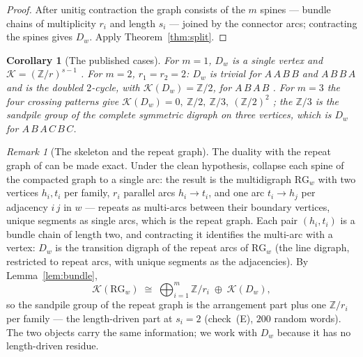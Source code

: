 \documentclass[11pt]{article}
\theoremstyle{plain}
\newtheorem{corollary}[theorem]{Corollary}
\theoremstyle{definition}
\theoremstyle{remark}
\newtheorem{remark}[theorem]{Remark}
\newcommand{\Z}{\mathbb{Z}}
\newcommand{\K}{\mathcal{K}}
\begin{document}
\begin{proof}
After unitig contraction the graph consists of the $m$ spines --- bundle chains of
multiplicity $r_i$ and length $s_i$ --- joined by the connector arcs; contracting the
spines gives $D_w$. Apply Theorem~\ref{thm:split}.
\end{proof}

\begin{corollary}[The published cases]\label{cor:cases}
For $m=1$, $D_w$ is a single vertex and $\K=(\Z/r)^{s-1}$ \cite[Thm.~5]{Bio1}. For $m=2$,
$r_1=r_2=2$: $D_w$ is trivial for $A\,A\,B\,B$ and $A\,B\,B\,A$ and is the doubled
$2$-cycle, with $\K(D_w)=\Z/2$, for $A\,B\,A\,B$ \cite[Thm.~6]{Bio1}. For $m=3$ the four
crossing patterns give $\K(D_w)=0,\ \Z/2,\ \Z/3,\ (\Z/2)^{2}$ \cite[Prop.~8]{Bio1}; the
$\Z/3$ is the sandpile group of the complete symmetric digraph on three vertices, which is
$D_w$ for $A\,B\,A\,C\,B\,C$.
\end{corollary}

\begin{remark}[The skeleton and the repeat graph]\label{rem:rg}
The duality with the repeat graph of \cite{PTT,Flye} can be made exact. Under the clean
hypothesis, collapse each spine of the compacted graph to a single arc: the result is the
multidigraph $\mathrm{RG}_w$ with two vertices $h_i,t_i$ per family, $r_i$ parallel arcs
$h_i\to t_i$, and one arc $t_i\to h_j$ per adjacency $i\,j$ in $w$ --- repeats as
multi-arcs between their boundary vertices, unique segments as single arcs, which is the
repeat graph. Each pair $(h_i,t_i)$ is a bundle chain of length two, and contracting it
identifies the multi-arc with a vertex: $D_w$ is the transition digraph of the repeat
arcs of $\mathrm{RG}_w$ (the line digraph, restricted to repeat arcs, with unique
segments as the adjacencies). By Lemma~\ref{lem:bundle},
\[
\K(\mathrm{RG}_w)\;\cong\;\bigoplus_{i=1}^{m}\Z/r_i\;\oplus\;\K(D_w),
\]
so the sandpile group of the repeat graph is the arrangement part plus one $\Z/r_i$ per
family --- the length-driven part at $s_i=2$ (check~(E), $200$ random words). The two
objects carry the same information; we work with $D_w$ because it has no length-driven
residue.
\end{remark}
\end{document}
